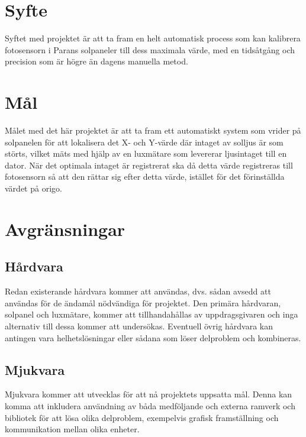 \documentclass{article}
\begin{document}


\section{Syfte} %
\label{sec:syfte}
    Syftet med projektet är att ta fram en helt automatisk process som kan kalibrera fotosensorn i Parans solpaneler till dess maximala värde, med en tidsåtgång och precision som är högre än dagens manuella metod.


\section{Mål} %
\label{sec:m_l}

    Målet med det här projektet är att ta fram ett automatiskt system som vrider på solpanelen för att lokalisera det X- och Y-värde där intaget av solljus är som störts, vilket mäts med hjälp av en luxmätare som levererar ljusintaget till en dator. När det optimala intaget är registrerat ska då detta värde registreras till fotosensorn så att den rättar sig efter detta värde, istället för det förinställda värdet på origo. 


\section{Avgränsningar} %
\label{sec:avgr_nsningar}
    \subsection{Hårdvara} %
    \label{subsec:h_rdvara}
    Redan existerande hårdvara kommer att användas, dvs. sådan avsedd att användas för de ändamål nödvändiga för projektet. Den primära hårdvaran, solpanel och luxmätare, kommer att tillhandahållas av uppdragsgivaren och inga alternativ till dessa kommer att undersökas. Eventuell övrig hårdvara kan antingen vara helhetslösningar eller sådana som löser delproblem och kombineras. \bigskip

    \subsection{Mjukvara} %
    \label{subsec:mjukvara}
    Mjukvara kommer att utvecklas för att nå projektets uppsatta mål. Denna kan komma att inkludera användning av båda medföljande och externa ramverk och bibliotek för att lösa olika delproblem, exempelvis grafisk framställning och kommunikation mellan olika enheter.
\end{document}
